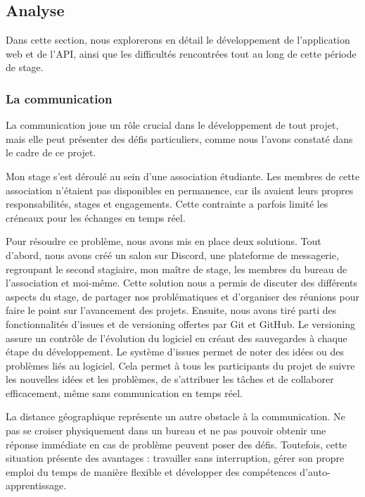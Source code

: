 \subsection{Analyse}

Dans cette section, nous explorerons en détail le développement de l'application web et de l'API, ainsi que les difficultés rencontrées tout au long de cette période de stage.

\subsubsection{La communication}

La communication joue un rôle crucial dans le développement de tout projet, mais elle peut présenter des défis particuliers, comme nous l'avons constaté dans le cadre de ce projet.

\medskip

Mon stage s'est déroulé au sein d'une association étudiante. Les membres de cette association n'étaient pas disponibles en permanence, car ils avaient leurs propres responsabilités, stages et engagements. Cette contrainte a parfois limité les créneaux pour les échanges en temps réel.

Pour résoudre ce problème, nous avons mis en place deux solutions. Tout d'abord, nous avons créé un salon sur Discord, une plateforme de messagerie, regroupant le second stagiaire, mon maître de stage, les membres du bureau de l'association et moi-même. Cette solution nous a permis de discuter des différents aspects du stage, de partager nos problématiques et d'organiser des réunions pour faire le point sur l'avancement des projets. Ensuite, nous avons tiré parti des fonctionnalités d'issues et de versioning offertes par Git et GitHub. Le versioning assure un contrôle de l'évolution du logiciel en créant des sauvegardes à chaque étape du développement. Le système d'issues permet de noter des idées ou des problèmes liés au logiciel. Cela permet à tous les participants du projet de suivre les nouvelles idées et les problèmes, de s'attribuer les tâches et de collaborer efficacement, même sans communication en temps réel.

\medskip

La distance géographique représente un autre obstacle à la communication. Ne pas se croiser physiquement dans un bureau et ne pas pouvoir obtenir une réponse immédiate en cas de problème peuvent poser des défis. Toutefois, cette situation présente des avantages : travailler sans interruption, gérer son propre emploi du temps de manière flexible et développer des compétences d'auto-apprentissage.

